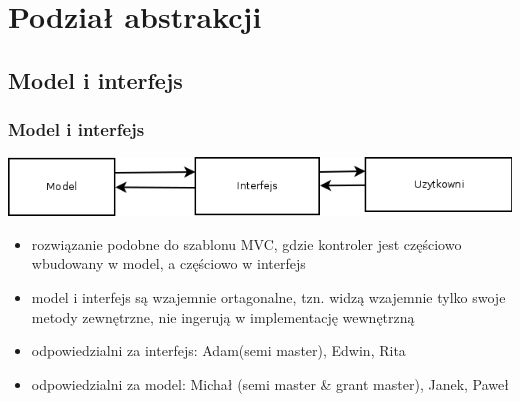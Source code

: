 \documentclass[a4paper, 11pt]{beamer}
\begin{document}
\section{Podział abstrakcji}
\subsection{Model i interfejs}
\begin{frame}
\frametitle{Model i interfejs}
\includegraphics[scale=0.4]{ModelInterf.png}
\begin{itemize}
\item rozwiązanie podobne do szablonu MVC, gdzie kontroler jest częściowo wbudowany w model, a częściowo w interfejs
\item model i interfejs są wzajemnie ortagonalne, tzn. widzą wzajemnie tylko swoje metody zewnętrzne, nie ingerują w implementację wewnętrzną
\item odpowiedzialni za interfejs: Adam(semi master), Edwin, Rita
\item odpowiedzialni za model: Michał (semi master \& grant master), Janek, Paweł
\end{itemize}
\end{frame}
\end{document}
